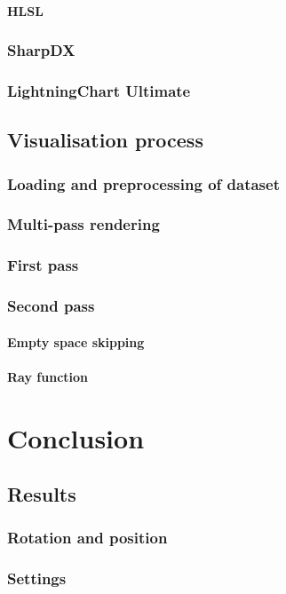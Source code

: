 \documentclass[twoside, english, 11pt]{report}
\begin{document}
\subsubsection{HLSL}
\subsection{SharpDX}
\subsection{LightningChart Ultimate}
\section{Visualisation process}
\subsection{Loading and preprocessing of dataset}
\subsection{Multi-pass rendering}
\subsection{First pass}
\subsection{Second pass}
\subsubsection{Empty space skipping}
\subsubsection{Ray function}

\chapter{Conclusion}
\section{Results}
\subsection{Rotation and position}
\subsection{Settings}
\end{document}
